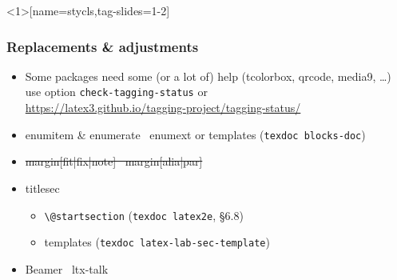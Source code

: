 \documentclass{ltx-talk}
\newcommand{\cs}[1]{\texttt{\textbackslash #1}}
\begin{document}
\begin{frame}<1>[name=stycls,tag-slides=1-2]
\frametitle{Replacements \& adjustments}
\begin{itemize}
\item Some packages need some (or a lot of) help (tcolorbox, qrcode, media9, \ldots)\\
use option \texttt{check-tagging-status} or\\
\url{https://latex3.github.io/tagging-project/tagging-status/}
\item enumitem \& enumerate \textrightarrow\ enumext or templates (\texttt{texdoc blocks-doc})
\item \sout{margin[fit|fix|note] \textrightarrow\ margin[alia|par]}
\item titlesec \textrightarrow
\begin{itemize}
\item \cs{@startsection} (\texttt{texdoc latex2e}, \S6.8)
\item templates (\texttt{texdoc latex-lab-sec-template})
\end{itemize}
\renewcommand{\ULthickness}{1pt}
\item<1-|alert@2> Beamer \textrightarrow\ ltx-talk 
\end{itemize}
\end{frame}

\end{document}
